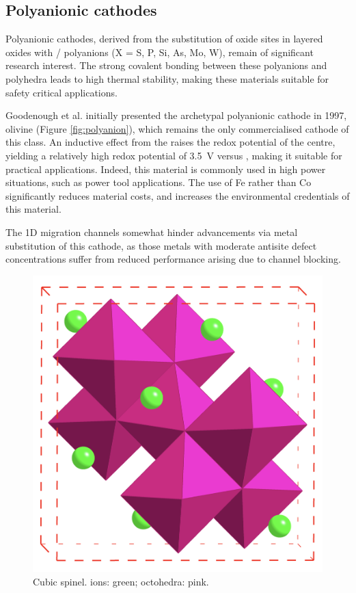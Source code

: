 \subsection{Polyanionic cathodes}
Polyanionic cathodes, derived from the substitution of oxide sites in layered oxides with / polyanions (X = S, P, Si, As, Mo, W),\cite{Gong2011a} remain of significant research interest.
The strong covalent bonding between these polyanions and  polyhedra leads to high thermal stability, making these materials suitable for safety critical applications.\cite{Nitta2015}

Goodenough et al.\cite{Padhi1997} initially presented the archetypal polyanionic cathode in 1997, olivine  (Figure \ref{fig:polyanion}), which remains the only commercialised cathode of this class.
An inductive effect from the  raises the redox potential of the  centre, yielding a relatively high  redox potential of \SI{3.5}{\volt} versus , making it suitable for practical applications.
Indeed, this material is commonly used in high power situations, such as power tool applications.
The use of Fe rather than Co significantly reduces material costs, and increases the environmental credentials of this material.

The 1D migration channels\cite{Islam2014} somewhat hinder advancements via metal substitution of this cathode, as those metals with moderate  antisite defect concentrations suffer from reduced performance arising due to channel blocking.\cite{Fisher2008b}

\newpage
\begin{figure}
\centering
\includegraphics[width=0.7\linewidth]{figures/structures/LiMn2O4}
\caption[Cubic  spinel]{Cubic  spinel.  ions: green;  octohedra: pink.} 
\label{fig:spinel}
\end{figure}

